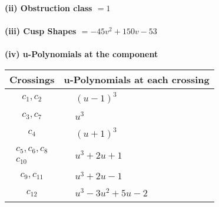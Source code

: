 \documentclass[1p]{elsarticle_modified}
\theoremstyle{definition}
\begin{document}
\flushleft \textbf{(ii) Obstruction class $= 1$}\\~\\
\flushleft \textbf{(iii) Cusp Shapes $= -45 v^2+150 v-53$}\\~\\
\newpage\renewcommand{\arraystretch}{1}
\flushleft \textbf{(iv) u-Polynomials at the component}\newline \\
\begin{tabular}{m{50pt}|m{274pt}}
Crossings & \hspace{64pt}u-Polynomials at each crossing \\
\hline $$\begin{aligned}c_{1},c_{2}\end{aligned}$$&$\begin{aligned}
&(u-1)^3
\end{aligned}$\\
\hline $$\begin{aligned}c_{3},c_{7}\end{aligned}$$&$\begin{aligned}
&u^3
\end{aligned}$\\
\hline $$\begin{aligned}c_{4}\end{aligned}$$&$\begin{aligned}
&(u+1)^3
\end{aligned}$\\
\hline $$\begin{aligned}c_{5},c_{6},c_{8}\\c_{10}\end{aligned}$$&$\begin{aligned}
&u^3+2 u+1
\end{aligned}$\\
\hline $$\begin{aligned}c_{9},c_{11}\end{aligned}$$&$\begin{aligned}
&u^3+2 u-1
\end{aligned}$\\
\hline $$\begin{aligned}c_{12}\end{aligned}$$&$\begin{aligned}
&u^3-3 u^2+5 u-2
\end{aligned}$\\
\hline
\end{tabular}\\~\\
\end{document}
